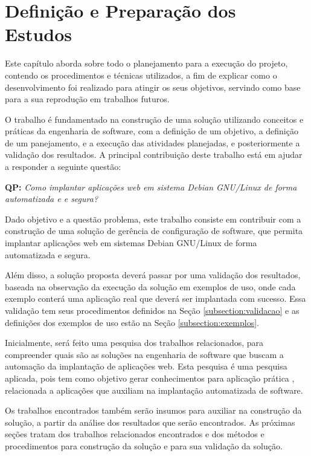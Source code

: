 \chapter{Definição e Preparação dos Estudos}

\label{cap-metodologia}
Este capítulo aborda sobre todo o planejamento para a execução do projeto,
contendo os procedimentos e técnicas utilizados, a fim de
explicar como o desenvolvimento foi realizado para atingir os seus objetivos,
servindo como base para a sua reprodução em trabalhos futuros.

O trabalho é fundamentado na construção de uma solução utilizando conceitos e práticas
da engenharia de software, com a definição de um objetivo, a definição de um panejamento,
e a execução das atividades planejadas, e posteriormente a validação dos resultados. 
A principal contribuição deste trabalho está em ajudar a responder a seguinte questão:

\begin{center}
 \textbf{QP:}
  \textit{
  Como implantar aplicações web em sistema Debian GNU/Linux de forma automatizada e
  e segura?
}
\end{center}

Dado objetivo e a questão problema, este trabalho consiste em contribuir
com a construção de uma solução de gerência de configuração de software, que permita implantar
aplicações web em sistemas Debian GNU/Linux de forma automatizada e segura.

Além disso, a solução proposta deverá passar
por uma validação dos resultados, baseada na observação
da execução da solução em exemplos de uso, onde cada exemplo conterá uma aplicação
real que deverá ser implantada com sucesso. Essa validação tem seus procedimentos
definidos na Seção \ref{subsection:validacao} e as definições dos exemplos de uso
estão na Seção \ref{subsection:exemplos}.

Inicialmente, será feito uma pesquisa dos trabalhos relacionados, para compreender
quais são as soluções na engenharia de software que buscam a automação da implantação
de aplicações web. Esta pesquisa é uma pesquisa aplicada, pois tem como objetivo
gerar conhecimentos para aplicação prática \cite{gerhardt2009metodos},
relacionada a aplicações que auxiliam na implantação automatizada de software.

Os trabalhos encontrados também serão insumos para auxiliar na construção da
solução, a partir da análise dos resultados que serão encontrados. As próximas
seções tratam dos trabalhos relacionados encontrados e dos métodos e
procedimentos para construção da solução e para sua validação da solução.

